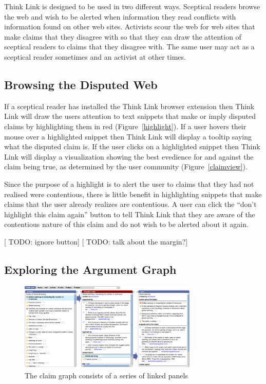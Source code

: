 \documentclass{chi2009}
\newcommand{\todo}[1]{{[\color{blue} TODO: #1]}}
\begin{document}
Think Link is designed to be used in two different ways. Sceptical readers browse the web and wish to be alerted when information they read conflicts with information found on other web sites. Activists scour the web for web sites that make claims that they disagree with so that they can draw the attention of sceptical readers to claims that they disagree with. The same user may act as a sceptical reader sometimes and an activist at other times.

\subsection{Browsing the Disputed Web}

If a sceptical reader has installed the Think Link browser extension then Think Link will draw the users attention to text snippets that make or imply disputed claims by highlighting them in red (Figure~\ref{highlight}). If a user hovers their mouse over a highlighted snippet then Think Link will display a tooltip saying what the disputed claim is. If the user clicks on a highlighted snippet then Think Link will display a visualization showing the best evedience for and against the claim being true, as determined by the user community (Figure~\ref{claimview}). 

Since the purpose of a highlight is to alert the user to claims that they had not realised were contentious, there is little benefit in highlighting snippets that make claims that the user already realizes are contentious. A user can click the ``don't highlight this claim again'' button to tell Think Link that they are aware of the contentious nature of this claim and do not wish to be alerted about it again.

\todo{ignore button}
\todo{talk about the margin?}

\subsection{Exploring the Argument Graph}

\begin{figure}[tb]
	\begin{center}
	\includegraphics[width=8.5cm]{../screenshots/v2_panels.png}
	\caption{The claim graph consists of a series of linked panels}
	\label{panels}
	\end{center}
\end{figure}
\end{document}
